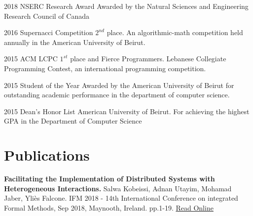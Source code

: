 \documentclass{tccv}
\begin{document}
\begin{yearlist}

\item{2018}
     {NSERC Research Award}
     {Awarded by the Natural Sciences and Engineering Research Council of Canada}


\item{2016}
     {Supernacci Competition}
     {$2^{nd}$ place. An algorithmic-math competition held annually in the American University of Beirut.} 
\item{2015}
     {ACM LCPC}
     {$1^{st}$ place and Fierce Programmers. Lebanese Collegiate Programming Contest, an international programming competition.}

\item{2015}
     {Student of the Year}
     {Awarded by the American University of Beirut for outstanding academic performance in the department of computer science.}

\item{2015}
     {Dean's Honor List}
     {American University of Beirut. For achieving the highest GPA in the Department of Computer Science}

\end{yearlist}

    
\section{Publications}
\textbf{Facilitating the Implementation of Distributed Systems with Heterogeneous Interactions.} Salwa Kobeissi, Adnan Utayim, Mohamad Jaber, Yliès Falcone. IFM 2018 - 14th International Conference on integrated Formal Methods, Sep 2018, Maynooth, Ireland. pp.1-19. \href{https://link.springer.com/chapter/10.1007/978-3-319-98938-9_15?fbclid=IwAR3mB_0l1FImySHqTeFfwwBxNwwAB3lfXOTerruuuzMAQN9nHZKYdGKVSzk}{Read Online}
\end{document}
